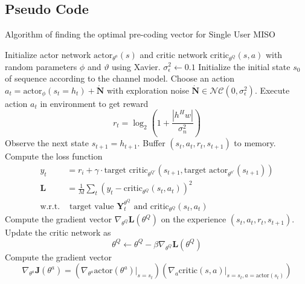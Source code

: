 \subsection{Pseudo Code}
\vspace{-30pt}
\begin{samepage}
\begin{algorithm}
    \caption{Algorithm of finding the optimal pre-coding vector for Single User MISO}
    \label{alg:single-user}
    \begin{algorithmic}
        \State Initialize actor network $\text{actor}_{\theta^a}(s)$ and critic network $\text{critic}_{\theta^Q}(s,a)$ with random parameters $\phi$ and $\vartheta$ using Xavier.
        \State $\sigma^2_\epsilon \gets 0.1$
            \State Initialize the initial state $s_0$ of sequence according to the channel model.
                \State Choose an action $a_t = \text{actor}_\phi(s_t = h_t) + \acute{\mathbf{N}}$ with exploration noise $\acute{\mathbf{N}} \in \mathcal{N} \mathcal{C}  \left( 0, \sigma^2_\epsilon \right)$.
                \State Execute action $a_t$ in environment to get reward \[ r_t = \log_2 \left( 1 + \frac{ |h^Hw| }{\sigma^2_n} \right) \]
                \State Observe the next state $s_{t+1} = h_{t+1}$.
                \State Buffer $(s_t, a_t, r_t, s_{t+1})$ to memory.
                \State Compute the loss function 
                \begin{equation}
                    \begin{aligned}
                        y_t &= r_i + \gamma \cdot \text{target critic}_{\theta^{Q'}} \left( s_{t+1} , \text{target actor}_{\theta^{a'}}(s_{t+1}) \right) \\
                        \mathbf{L} &= \frac{1}{M} \sum_{t} \left( y_t - \text{critic}_{\theta^Q}(s_t, a_t) \right)^2 \\
                        \text{w.r.t.} & \text{ target value } \mathbf{Y}^{\theta^Q}_t \text{ and } \text{critic}_{\theta^Q}(s_t, a_t)
                    \end{aligned}
                \end{equation}
                \State Compute the gradient vector $\nabla_{\theta^Q} \mathbf{L}(\theta^Q)$ on the experience $(s_t, a_t, r_t, s_{t+1})$.
                \State Update the critic network as \[ \theta^Q \gets \theta^Q - \beta \nabla_{\theta^Q} \mathbf{L}(\theta^Q) \]
                \State Compute the gradient vector \[ \nabla_{\theta^a} \mathbf{J}(\theta^a) = \left( \nabla_{\theta^a} \text{actor}(\theta^a) |_{s=s_t} \right) \left( \nabla_{a} \text{critic}(s,a)|_{s=s_t , a = \text{actor}(s_t)} \right) \]

\end{algorithmic}
\end{algorithm}
\end{samepage}
